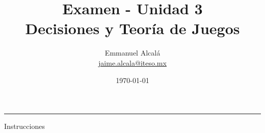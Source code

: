 \documentclass[12pt]{scrartcl} %
\title{Examen - Unidad 3 \\ \normalsize Decisiones y Teoría de Juegos}
\author{Emmanuel Alcalá\\ \url{jaime.alcala@iteso.mx}}
\date{\today}
\begin{document}
\maketitle
\hrule

\begin{summarybox}{Instrucciones}

    
    \begin{description} %
      

\end{description}
\end{summarybox}
\end{document}
